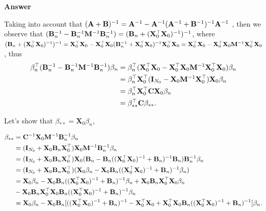 \begin{enumerate}[leftmargin=*]
\textbf{Answer}

Taking into account that $({\bf{A}}+{\bf{B}})^{-1}={\bf{A}}^{-1}-{\bf{A}}^{-1}({\bf{A}}^{-1}+{\bf{B}}^{-1})^{-1}{\bf{A}}^{-1}$ \cite{Smith1973}, then we observe that $({\bf{B}}_n^{-1}-{\bf{B}}_n^{-1}{\bf{M}}^{-1}{\bf{B}}_n^{-1})=({\bf{B}}_n+({\bf{X}}_0^{\top}{\bf{X}}_0)^{-1})^{-1}$, where $({\bf{B}}_n+({\bf{X}}_0^{\top}{\bf{X}}_0)^{-1})^{-1}={\bf{X}}_0^{\top}{\bf{X}}_0-{\bf{X}}_0^{\top}{\bf{X}}_0({\bf{B}}_n^{-1}+{\bf{X}}_0^{\top}{\bf{X}}_0)^{-1}{\bf{X}}_0^{\top}{\bf{X}}_0={\bf{X}}_0^{\top}{\bf{X}}_0-{\bf{X}}_0^{\top}{\bf{X}}_0{\bf{M}}^{-1}{\bf{X}}_0^{\top}{\bf{X}}_0$, thus
\begin{align*}
	\beta_n^{\top}({\bf{B}}_n^{-1}-{\bf{B}}_n^{-1}{\bf{M}}^{-1}{\bf{B}}_n^{-1})\beta_n&=\beta_n^{\top}({\bf{X}}_0^{\top}{\bf{X}}_0-{\bf{X}}_0^{\top}{\bf{X}}_0{\bf{M}}^{-1}{\bf{X}}_0^{\top}{\bf{X}}_0)\beta_n\\
	&=\beta_n^{\top}{\bf{X}}_0^{\top}({\bf{I}}_{N_0}-{\bf{X}}_0{\bf{M}}^{-1}{\bf{X}}_0^{\top}){\bf{X}}_0\beta_n\\
	&=\beta_n^{\top}{\bf{X}}_0^{\top}{\bf{C}}{\bf{X}}_0\beta_n\\
	&={\bf{\beta}}_{**}^{\top}{\bf{C}}{\bf{\beta}}_{**}.
\end{align*}

Let's show that $\beta_{**}={\mathbf{X}}_0\beta_n$,

\begin{align*}
	\beta_{**}&={\bf{C}}^{-1}{\bf{X}}_0{\bf{M}}^{-1}{\bf{B}}_n^{-1}\beta_n\\
	&=({\bf{I}}_{N_0}+{\bf{X}}_0{\bf{B}}_n{\bf{X}}_0^{\top}){\bf{X}}_0{\bf{M}}^{-1}{\bf{B}}_n^{-1}\beta_n\\
	&=({\bf{I}}_{N_0}+{\bf{X}}_0{\bf{B}}_n{\bf{X}}_0^{\top}){\bf{X}}_0({\bf{B}}_n-{\bf{B}}_n(({\bf{X}}_0^{\top}{\bf{X}}_0)^{-1}+{\bf{B}}_n)^{-1}{\bf{B}}_n){\bf{B}}_n^{-1}\beta_n\\
	&=({\bf{I}}_{N_0}+{\bf{X}}_0{\bf{B}}_n{\bf{X}}_0^{\top})({\bf{X}}_0\beta_n-{\bf{X}}_0{\bf{B}}_n(({\bf{X}}_0^{\top}{\bf{X}}_0)^{-1}+{\bf{B}}_n)^{-1}\beta_n)\\
	&={\bf{X}}_0\beta_n-{\bf{X}}_0{\bf{B}}_n(({\bf{X}}_0^{\top}{\bf{X}}_0)^{-1}+{\bf{B}}_n)^{-1}\beta_n+{\bf{X}}_0{\bf{B}}_n{\bf{X}}_0^{\top}{\bf{X}}_0\beta_n\\
	&-{\bf{X}}_0{\bf{B}}_n{\bf{X}}_0^{\top}{\bf{X}}_0{\bf{B}}_n(({\bf{X}}_0^{\top}{\bf{X}}_0)^{-1}+{\bf{B}}_n)^{-1}\beta_n\\
	&={\bf{X}}_0\beta_n-{\bf{X}}_0{\bf{B}}_n[(({\bf{X}}_0^{\top}{\bf{X}}_0)^{-1}+{\bf{B}}_n)^{-1}-{\bf{X}}_0^{\top}{\bf{X}}_0+{\bf{X}}_0^{\top}{\bf{X}}_0{\bf{B}}_n(({\bf{X}}_0^{\top}{\bf{X}}_0)^{-1}+{\bf{B}}_n)^{-1}]\beta_n.
\end{align*}


\end{enumerate}
